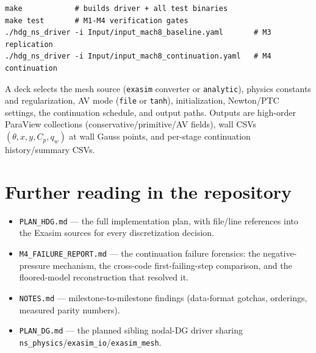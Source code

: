 \documentclass[11pt]{article}
\newcommand{\code}[1]{\texttt{#1}}
\begin{document}
\begin{verbatim}
make            # builds driver + all test binaries
make test       # M1-M4 verification gates
./hdg_ns_driver -i Input/input_mach8_baseline.yaml       # M3 replication
./hdg_ns_driver -i Input/input_mach8_continuation.yaml   # M4 continuation
\end{verbatim}
A deck selects the mesh source (\code{exasim} converter or \code{analytic}),
physics constants and regularization, AV mode (\code{file} or \code{tanh}),
initialization, Newton/PTC settings, the continuation schedule, and output
paths. Outputs are high-order ParaView collections
(conservative/primitive/AV fields), wall CSVs
$(\theta, x, y, C_p, q_w)$ at wall Gauss points, and per-stage
continuation history/summary CSVs.

\section*{Further reading in the repository}

\begin{itemize}
\item \code{PLAN\_HDG.md} --- the full implementation plan, with
file/line references into the Exasim sources for every discretization
decision.
\item \code{M4\_FAILURE\_REPORT.md} --- the continuation failure forensics:
the negative-pressure mechanism, the cross-code first-failing-step
comparison, and the floored-model reconstruction that resolved it.
\item \code{NOTES.md} --- milestone-to-milestone findings (data-format
gotchas, orderings, measured parity numbers).
\item \code{PLAN\_DG.md} --- the planned sibling nodal-DG driver sharing
\code{ns\_physics}/\code{exasim\_io}/\code{exasim\_mesh}.
\end{itemize}
\end{document}
